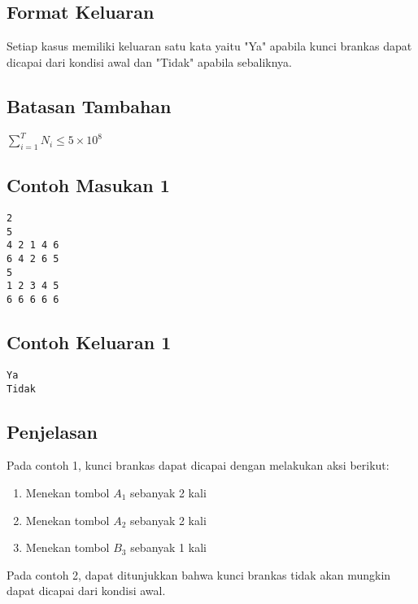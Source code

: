 \documentclass{article}
\begin{document}
\subsection*{Format Keluaran}

Setiap kasus memiliki keluaran satu kata yaitu "Ya" apabila kunci brankas dapat dicapai dari kondisi awal dan "Tidak" apabila sebaliknya.

\subsection*{Batasan Tambahan}
$\sum_{i=1}^T N_i \leq 5 \times 10^{8}$

\begin{multicols}{2}
\subsection*{Contoh Masukan 1}
\begin{lstlisting}
2
5
4 2 1 4 6
6 4 2 6 5
5
1 2 3 4 5
6 6 6 6 6
\end{lstlisting}
\columnbreak
\subsection*{Contoh Keluaran 1}
\begin{lstlisting}
Ya
Tidak
\end{lstlisting}
\vfill
\null
\end{multicols}


\subsection*{Penjelasan}

Pada contoh 1, kunci brankas dapat dicapai dengan melakukan aksi berikut:

\begin{enumerate}
\item Menekan tombol $A_1$ sebanyak 2 kali
\item Menekan tombol $A_2$ sebanyak 2 kali
\item Menekan tombol $B_3$ sebanyak 1 kali
\end{enumerate}

Pada contoh 2, dapat ditunjukkan bahwa kunci brankas tidak akan mungkin dapat dicapai dari kondisi awal.
\end{document}
